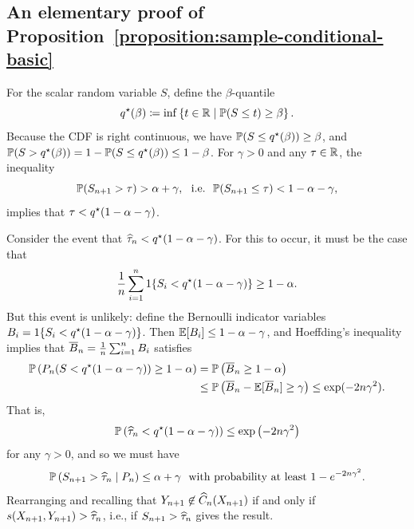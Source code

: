 \documentclass{article}
\newcommand{\scorefunc}{s}
\newcommand{\scoreval}{\scorefunc}
\newcommand{\scorerv}{S}
\begin{document}
\subsection{An elementary proof of
  Proposition~\ref{proposition:sample-conditional-basic}}

For the scalar random variable $\scorerv$, define the $\beta$-quantile
\begin{equation}
  \label{eqn:actual-quantile-mapping}
  q\opt(\beta) \defeq \inf \left\{t \in \R
  \mid \P(\scorerv \le t) \ge \beta \right\}.
\end{equation}
Because the CDF is right continuous, we have $\mathbb{P}(S \le q^\star(\beta)) \ge
\beta$, and $\mathbb{P}(S > q^\star(\beta)) = 1 - \mathbb{P}(S \le q^\star(\beta)) \le 1 -
\beta$.
%
For $\gamma > 0$ and any $\tau \in \mathbb{R}$, the inequality
\begin{equation*}
  \P(\scorerv_{n + 1} > \tau) > \alpha + \gamma,
  ~~ \mbox{i.e.} ~~
  \P(\scorerv_{n + 1} \le \tau) < 1 - \alpha - \gamma,
\end{equation*}
implies that $\tau < q^\star(1 - \alpha - \gamma)$.

Consider the event that $\widehat{\tau}_n < q^\star(1 - \alpha - \gamma)$.
%
For this to occur, it must be the case that
\begin{equation}
  \label{eqn:quantile-too-small}
  \frac{1}{n} \sum_{i = 1}^n \indic{\scorerv_i < q\opt(1 - \alpha - \gamma)}
  \ge 1 - \alpha.
\end{equation}
But this event is unlikely: define the Bernoulli indicator variables $B_i =
\indic{\scorerv_i < q\opt(1 - \alpha - \gamma)}$.
%
Then $\mathbb{E}[B_i] \le 1 -
\alpha - \gamma$, and Hoeffding's inequality implies
that $\overline{B}_n = \frac{1}{n} \sum_{i = 1}^n B_i$ satisfies
\begin{align*}
  \P\left(P_n(\scorerv < q\opt(1 - \alpha - \gamma)) \ge 1 - \alpha
  \right)
  & = \P\left(\wb{B}_n \ge 1 - \alpha\right) \\
  & \le \P\left(\wb{B}_n - \E[\wb{B}_n] \ge \gamma\right)
  \le \exp(-2 n \gamma^2).
\end{align*}
That is,
\begin{align*}
  \mathbb{P}\left(\widehat{\tau}_n < q^\star(1 - \alpha - \gamma)\right)
  \le \exp\left(-2n\gamma^2 \right)
\end{align*}
for any $\gamma > 0$, and so we must have
\begin{equation*}
  \P\left(\scorerv_{n + 1} > \what{\tau}_n \mid P_n \right) \le \alpha + \gamma
  ~~ \mbox{with~probability~at~least}~
  1 - e^{-2n\gamma^2}.
\end{equation*}
Rearranging and recalling that $Y_{n + 1} \not \in \widehat{C}_n(X_{n + 1})$ if
and only if $\scoreval(X_{n+1}, Y_{n + 1}) > \what{\tau}_n$, i.e., if
$\scorerv_{n + 1} > \what{\tau}_n$ gives the result.
\end{document}
